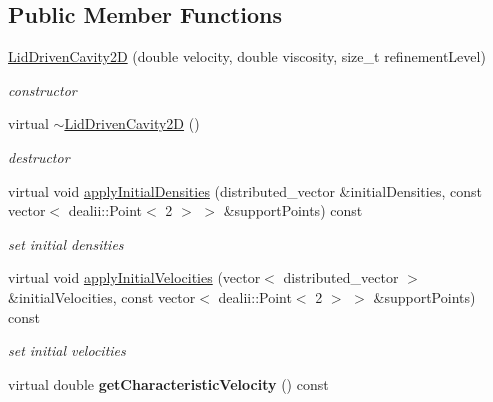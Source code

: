 \subsection*{Public Member Functions}
\begin{DoxyCompactItemize}
\item 
\hyperlink{classnatrium_1_1LidDrivenCavity2D_a139fe700f3e871e1b51eada1a41c69b1}{Lid\-Driven\-Cavity2\-D} (double velocity, double viscosity, size\-\_\-t refinement\-Level)
\begin{DoxyCompactList}\small\item\em constructor \end{DoxyCompactList}\item 
\hypertarget{classnatrium_1_1LidDrivenCavity2D_a8ae5029b008eb3d3c810bae81440b29c}{virtual \hyperlink{classnatrium_1_1LidDrivenCavity2D_a8ae5029b008eb3d3c810bae81440b29c}{$\sim$\-Lid\-Driven\-Cavity2\-D} ()}\label{classnatrium_1_1LidDrivenCavity2D_a8ae5029b008eb3d3c810bae81440b29c}

\begin{DoxyCompactList}\small\item\em destructor \end{DoxyCompactList}\item 
virtual void \hyperlink{classnatrium_1_1LidDrivenCavity2D_ab4a8629cfd3472847d40cf42a4ca72a8}{apply\-Initial\-Densities} (distributed\-\_\-vector \&initial\-Densities, const vector$<$ dealii\-::\-Point$<$ 2 $>$ $>$ \&support\-Points) const 
\begin{DoxyCompactList}\small\item\em set initial densities \end{DoxyCompactList}\item 
virtual void \hyperlink{classnatrium_1_1LidDrivenCavity2D_a6e633e30cfeae500757bdd4c37a5c478}{apply\-Initial\-Velocities} (vector$<$ distributed\-\_\-vector $>$ \&initial\-Velocities, const vector$<$ dealii\-::\-Point$<$ 2 $>$ $>$ \&support\-Points) const 
\begin{DoxyCompactList}\small\item\em set initial velocities \end{DoxyCompactList}\item 
\hypertarget{classnatrium_1_1LidDrivenCavity2D_a82c2d453cd5dd83f09a438201a7adec6}{virtual double {\bfseries get\-Characteristic\-Velocity} () const }\label{classnatrium_1_1LidDrivenCavity2D_a82c2d453cd5dd83f09a438201a7adec6}

\end{DoxyCompactItemize}



